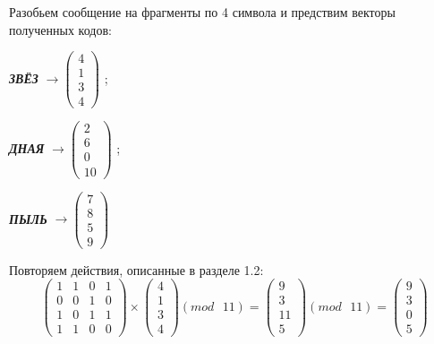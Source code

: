 \documentclass[a5paper, 10pt]{article}
\theoremstyle{definition}
\theoremstyle{plain}
\theoremstyle{remark}
\begin{document}
Разобьем сообщение на фрагменты по 4 символа и предствим векторы полученных кодов:
\begin{center}
\textbf{\textit{ЗВЁЗ}} $\to \begin{pmatrix}
 4\\
1\\
3\\
4
\end{pmatrix}$ ;

\textbf{\textit{ДНАЯ}}  $\to \begin{pmatrix}
 2\\
6\\
0\\
10
\end{pmatrix}$ ;

\textbf{\textit{ПЫЛЬ}}  $\to \begin{pmatrix}
7\\
8\\
 5\\
9
\end{pmatrix}$ \\
\end{center}
Повторяем действия, описанные в разделе 1.2:
\begin{equation}
\begin{pmatrix}
1 & 1 & 0 & 1\\
0 & 0 & 1 & 0 \\
1 & 0 & 1 & 1 \\
1 & 1 & 0 & 0
\end{pmatrix}
 \times
\begin{pmatrix}
 4\\
1\\
3\\
4
\end{pmatrix}
(mod \text{ }11)
= 
\begin{pmatrix}
9\\
3\\
11\\
5
\end{pmatrix}
(mod \text{ }11)
= \begin{pmatrix}
9\\
3\\
0\\
5
\end{pmatrix}
\end{equation}
\end{document}
